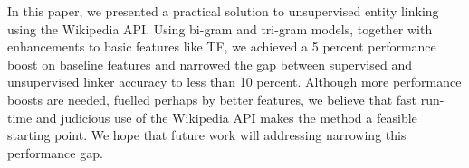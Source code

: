 In this paper, we presented a practical solution to unsupervised entity linking using the Wikipedia API. Using bi-gram and tri-gram models, together with enhancements to basic features like TF, we achieved a 5 percent performance boost on baseline features and narrowed the gap between supervised and unsupervised linker accuracy to less than 10 percent. Although more performance boosts are needed, fuelled perhaps by better features, we believe that fast run-time and judicious use of the Wikipedia API makes the method a feasible starting point. We hope that future work will addressing narrowing this performance gap.  